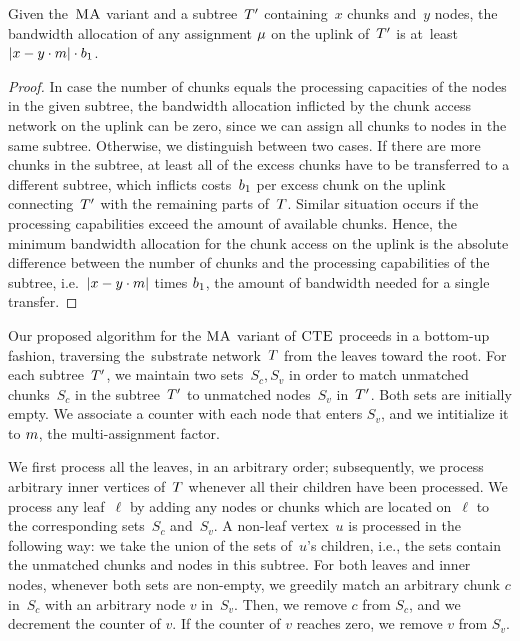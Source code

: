 

\begin{lemma}\label{lem:uplink-alloc}
Given the~$\textsc{MA}$ variant and a subtree~$T'$
containing~$x$
chunks and~$y$ nodes, the bandwidth allocation of any
assignment
$\mu$ on the uplink of~$T'$ is at~least $|x-y\cdot m|\cdot
b_1$.
\label{lemma:uplink}
\end{lemma}
\begin{proof}
In case the number of chunks equals the processing capacities of the
nodes in the given subtree,
the bandwidth allocation inflicted by the chunk access network on the uplink can
be
zero, since we can assign all chunks to nodes in the same subtree.
Otherwise, we distinguish between two cases. If there are more chunks in the subtree, at least all of the excess chunks have to
be transferred to a different subtree, which 
inflicts costs~$b_1$ per excess chunk on the uplink connecting~$T'$
with the
remaining parts of~$T$.
 Similar situation occurs if the processing capabilities exceed the
amount of
available chunks.
Hence, the minimum bandwidth allocation for the chunk access on the uplink
is the absolute difference between the number of chunks and the processing capabilities
of the subtree, i.e.~$|x-y\cdot m|$ times $b_1$, the amount of bandwidth needed
for a single transfer.
\end{proof}


 Our proposed algorithm for the $\textsc{MA}$ variant of $\textsc{CTE}$
proceeds in a bottom-up fashion, traversing the~substrate network~$T$
from the leaves toward the root.
For each subtree~$T'$, we maintain
two sets~$S_c,S_v$ in order to match unmatched
chunks~$S_c$ in the subtree~$T'$ to unmatched
nodes~$S_v$ in~$T'$. Both sets are initially empty.
We associate a counter with each node that enters $S_v$, and we intitialize it to $m$, the multi-assignment factor.


We first process all the leaves, in an arbitrary order; subsequently, we process arbitrary inner vertices
of~$T$ whenever all their children have been processed.
We process any leaf~$\ell$
by adding any
nodes or chunks which are located on~$\ell$ to the corresponding sets~$S_c$ and~$S_v$.
A non-leaf vertex~$u$ is processed in the following way: we take the union of
the sets of~$u$'s children, i.e., the sets contain the unmatched chunks and nodes
in this subtree.
For both leaves and inner nodes, whenever
both sets are non-empty, we greedily match an arbitrary chunk $c$ in~$S_c$ with an arbitrary node $v$ in~$S_v$.
Then, we remove $c$ from $S_c$, and we decrement the counter of $v$. If the counter of $v$ reaches zero, we remove $v$ from $S_v$.

